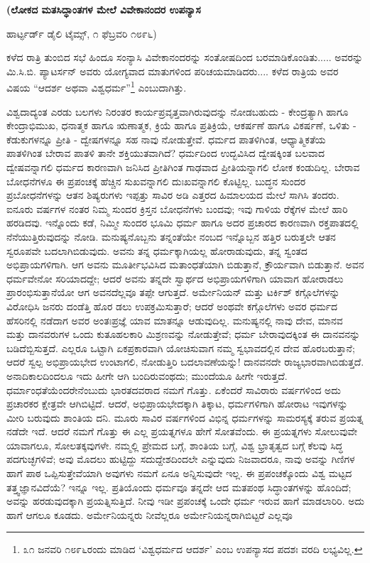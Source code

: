 \begin{center}
\textbf{(ಲೋಕದ ಮತಸಿದ್ಧಾಂತಗಳ ಮೇಲೆ ವಿವೇಕಾನಂದರ ಉಪನ್ಯಾಸ}
\end{center}

\begin{center}
ಹಾರ್ಟ್ಫರ್ಡ್ ಡೈಲಿ ಟೈಮ್ಸ್, ೧ ಫೆಬ್ರವರಿ ೧೮೯೬)
\end{center}

ಕಳೆದ ರಾತ್ರಿ ತುಂಬಿದ ಸಭೆ ಹಿಂದೂ ಸಂನ್ಯಾಸಿ ವಿವೇಕಾನಂದರನ್ನು ಸಂತೋಷದಿಂದ ಬರಮಾಡಿಕೊಂಡಿತು..... ಅವರನ್ನು ಮಿ.ಸಿ.ಬಿ. ಪ್ಯಾಟರ್ಸನ್ ಅವರು ಯೋಗ್ಯವಾದ ಮಾತುಗಳಿಂದ ಪರಿಚಯಮಾಡಿದರು.... ಕಳೆದ ರಾತ್ರಿಯ ಅವರ ವಿಷಯ “ಆದರ್ಶ ಅಥವಾ ವಿಶ್ವಧರ್ಮ”\footnote{೩೧ ಜನವರಿ ೧೮೯೬ರಂದು ಮಾಡಿದ ‘ವಿಶ್ವಧರ್ಮದ ಆದರ್ಶ’ ಎಂಬ ಉಪನ್ಯಾಸದ ಪದಶಃ ವರದಿ ಲಭ್ಯವಿಲ್ಲ.} ಎಂಬುದಾಗಿತ್ತು.

ವಿಶ್ವದಾದ್ಯಂತ ಎರಡು ಬಲಗಳು ನಿರಂತರ ಕಾರ್ಯಪ್ರವೃತ್ತವಾಗಿರುವುದನ್ನು ನೋಡಬಹುದು - ಕೇಂದ್ರತ್ಯಾಗಿ ಹಾಗೂ ಕೇಂದ್ರಾಭಿಮುಖ, ಧನಾತ್ಮಕ ಹಾಗೂ ಋಣಾತ್ಮಕ, ಕ್ರಿಯೆ ಹಾಗೂ ಪ್ರತಿಕ್ರಿಯೆ, ಆಕರ್ಷಣೆ ಹಾಗೂ ವಿಕರ್ಷಣೆ, ಒಳಿತು - ಕೆಡುಕುಗಳನ್ನೂ ಪ್ರೀತಿ - ದ್ವೇಷಗಳನ್ನೂ ಸಹ ನಾವು ನೋಡುತ್ತೇವೆ. ಧರ್ಮದ ಪಾತಳಿಗಿಂತ, ಆಧ್ಯಾತ್ಮಿಕತೆಯ ಪಾತಳಿಗಿಂತ ಬೇರಾವ ಪಾತಳಿ ತಾನೇ ಶಕ್ತಿಯುತವಾಗಿದೆ? ಧರ್ಮದಿಂದ ಉದ್ಭವಿಸಿದ ದ್ವೇಷಕ್ಕಿಂತ ಬಲವಾದ ದ್ವೇಷವನ್ನಾಗಲಿ ಧರ್ಮದ ಕಾರಣವಾಗಿ ಜನಿಸಿದ ಪ್ರೀತಿಗಿಂತ ಗಾಢವಾದ ಪ್ರೀತಿಯನ್ನಾಗಲಿ ಲೋಕ ಕಂಡುದಿಲ್ಲ. ಬೇರಾವ ಬೋಧನೆಗಳೂ ಈ ಪ್ರಪಂಚಕ್ಕೆ ಹೆಚ್ಚಿನ ಸುಖವನ್ನಾಗಲಿ ದುಃಖವನ್ನಾಗಲಿ ಕೊಟ್ಟಿಲ್ಲ. ಬುದ್ಧನ ಸುಂದರ ಪ್ರಬೋಧನೆಗಳನ್ನು ಆತನ ಶಿಷ್ಯರುಗಳು ಇಪ್ಪತ್ತು ಸಾವಿರ ಅಡಿ ಎತ್ತರದ ಹಿಮಾಲಯದ ಮೇಲೆ ಸಾಗಿಸಿ ತಂದರು. ಐನೂರು ವರ್ಷಗಳ ನಂತರ ನಿಮ್ಮ ಸುಂದರ ಕ್ರಿಸ್ತನ ಬೋಧನೆಗಳು ಬಂದವು; ಇವು ಗಾಳಿಯ ರೆಕ್ಕೆಗಳ ಮೇಲೆ ಹಾರಿ ಹರಡಿದವು. ಇನ್ನೊಂದು ಕಡೆ, ನಿಮ್ಮೀ ಸುಂದರ ಭೂಮಿ ಧರ್ಮ ಹಾಗೂ ಅದರ ಪ್ರಚಾರದ ಕಾರಣವಾಗಿ ರಕ್ತಪಾತದಲ್ಲಿ ನೆನೆಯುತ್ತಿರುವುದನ್ನು ನೋಡಿ. ಮನುಷ್ಯನೊಬ್ಬನು ತನ್ನಂತೆಯೇ ನಂಬದ ಇನ್ನೊಬ್ಬನ ಹತ್ತಿರ ಬರುತ್ತಲೇ ಆತನ ಸ್ವರೂಪವೇ ಬದಲಾಗಿಬಿಡುವುದು. ಅವನು ತನ್ನ ಧರ್ಮಕ್ಕಾಗಿಯಲ್ಲ ಹೋರಾಡುವುದು, ತನ್ನ ಸ್ವಂತದ ಅಭಿಪ್ರಾಯಗಳಿಗಾಗಿ. ಆಗ ಅವನು ಮೂರ್ತೀಭವಿಸಿದ ಮತಾಂಧತೆಯಾಗಿ ಬಿಡುತ್ತಾನೆ, ಕ್ರೌರ್ಯವಾಗಿ ಬಿಡುತ್ತಾನೆ. ಅವನ ಧರ್ಮವೇನೋ ಸರಿಯಾದದ್ದೇ; ಆದರೆ ಅವನು ತನ್ನದೇ ಸ್ವಾರ್ಥದ ಅಭಿಪ್ರಾಯಗಳಿಗಾಗಿ ಯಾವಾಗ ಹೋರಾಡಲು ಪ್ರಾರಂಭಿಸುತ್ತಾನೆಯೋ ಆಗ ಅವನದೆಲ್ಲವೂ ತಪ್ಪೇ ಆಗುತ್ತದೆ. ಅರ್ಮೇನಿಯನ್ ಮತ್ತು ಟರ್ಕಿಶ್ ಕಗ್ಗೊಲೆಗಳನ್ನು ವಿರೋಧಿಸಿ ಜನರು ದಂಡೆತ್ತಿ ಹೊರ ಡಲು ಉಪಕ್ರಮಿಸುತ್ತಾರೆ; ಆದರೆ ಅಂಥವೇ ಕಗ್ಗೊಲೆಗಳು ಅವರ ಧರ್ಮದ ಹೆಸರಿನಲ್ಲಿ ನಡೆದಾಗ ಅವರ ಅಂತಃಪ್ರಜ್ಞೆ ಯಾವ ಮಾತನ್ನೂ ಆಡುವುದಿಲ್ಲ. ಮನುಷ್ಯನಲ್ಲಿ ನಾವು ದೇವ, ಮಾನವ ಮತ್ತು ದಾನವರುಗಳ ಒಂದು ಕುತೂಹಲಕಾರಿ ಮಿಶ್ರಣವನ್ನು ನೋಡುತ್ತೇವೆ; ಧರ್ಮ ಬೇರಾವುದಕ್ಕಿಂತ ಈ ದಾನವನನ್ನು ಬಡಿದೆಬ್ಬಿಸುತ್ತದೆ. ಎಲ್ಲರೂ ಒಟ್ಟಾಗಿ ಏಕಪ್ರಕಾರವಾಗಿ ಯೋಚಿಸುವಾಗ ನಮ್ಮ ಸ್ವಭಾವದಲ್ಲಿನ ದೇವ ಹೊರಬರುತ್ತಾನೆ; ಆದರೆ ಸ್ವಲ್ಪ ಅಭಿಪ್ರಾಯಭೇದ ಉಂಟಾಗಲಿ, ನೋಡುತ್ತಿರಿ ಬದಲಾವಣೆಯನ್ನು! ದಾನವನದೇ ರಾಜ್ಯಭಾರವಾಗಿಬಿಡುತ್ತದೆ. ಅನಾದಿಕಾಲದಿಂದಲೂ ಇದು ಹೀಗೇ ಆಗಿ ಬಂದಿರುವಂಥದು; ಮುಂದೆಯೂ ಹೀಗೇ ಇರುತ್ತದೆ. ಧರ್ಮಾಂಧತೆಯೆಂದರೇನೆಂಬುದು ಭಾರತದವರಾದ ನಮಗೆ ಗೊತ್ತು. ಏಕೆಂದರೆ ಸಾವಿರಾರು ವರ್ಷಗಳಿಂದ ಅದು ಪ್ರಚಾರಕರ ಕ್ಷೇತ್ರವೇ ಆಗಿಬಿಟ್ಟಿದೆ. ಆದರೆ, ಅಭಿಪ್ರಾಯಭೇದಕ್ಕಾಗಿ ತಿಕ್ಕಾಟ, ಧರ್ಮಗಳಿಗಾಗಿ ಹೋರಾಟ ಇವುಗಳನ್ನು ಮೀರಿ ಬರುವುದು ಶಾಂತಿಯ ದನಿ. ಮೂರು ಸಾವಿರ ವರ್ಷಗಳಿಂದ ವಿಭಿನ್ನ ಧರ್ಮಗಳನ್ನು ಸಾಮರಸ್ಯಕ್ಕೆ ತರುವ ಪ್ರಯತ್ನ ನಡೆದೇ ಇದೆ. ಆದರೆ ನಮಗೆ ಗೊತ್ತು ಈ ಎಲ್ಲ ಪ್ರಯತ್ನಗಳೂ ಹೇಗೆ ಸೋತವೆಂದು. ಈ ಪ್ರಯತ್ನಗಳು ಸೋಲುವುವೇ ಯಾವಾಗಲೂ, ಸೋಲತಕ್ಕವುಗಳೇ. ನಮ್ಮಲ್ಲಿ ಪ್ರೇಮದ ಬಗ್ಗೆ, ಶಾಂತಿಯ ಬಗ್ಗೆ, ವಿಶ್ವ ಭ್ರಾತೃತ್ವದ ಬಗ್ಗೆ ಕೆಲವು ಸಿದ್ಧ ಪದಗುಚ್ಛಗಳಿವೆ; ಅವು ಮೊದಲು ಹುಟ್ಟಿದ್ದು ಸದುದ್ದೇಶದಿಂದಲೇ ಎನ್ನುವುದು ನಿಜವಾದರೂ, ನಾವು ಅವನ್ನು ಗಿಣಿಗಳ ಹಾಗೆ ಪಾಠ ಒಪ್ಪಿಸುತ್ತೇವೆಯಾಗಿ ಅವುಗಳು ನಮಗೆ ಏನೂ ಅನ್ನಿಸುವುದೇ ಇಲ್ಲ. ಈ ಪ್ರಪಂಚಕ್ಕೊಂದು ವಿಶ್ವ ಮಟ್ಟದ ತತ್ತ್ವಜ್ಞಾನವಿದೆಯೆ? ಇನ್ನೂ ಇಲ್ಲ. ಪ್ರತಿಯೊಂದು ಧರ್ಮವೂ ತನ್ನದೇ ಆದ ಮತಪಂಥ ಸಿದ್ಧಾಂತಗಳನ್ನು ಹೊಂದಿದೆ; ಅವನ್ನು ಹರಡುವುದಕ್ಕಾಗಿ ಪ್ರಯತ್ನಿಸುತ್ತಿದೆ. ನೀವು ಇಡೀ ಪ್ರಪಂಚಕ್ಕೆ ಒಂದೇ ಧರ್ಮ ಇರುವ ಹಾಗೆ ಮಾಡಲಾರಿರಿ. ಅದು ಹಾಗೆ ಆಗಲೂ ಕೂಡದು. ಅರ್ಮೇನಿಯನ್ನರು ನೀವೆಲ್ಲರೂ ಅರ್ಮೇನಿಯನ್ನರಾಗಿಬಿಟ್ಟರೆ ಎಲ್ಲವೂ 